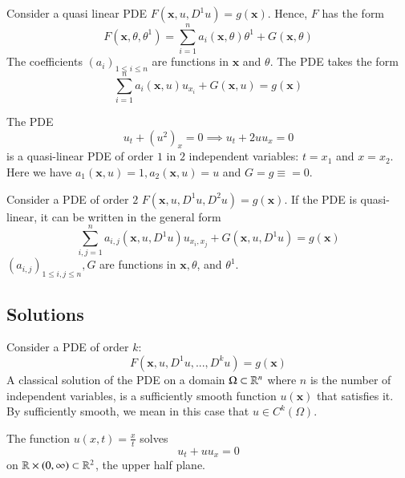 \documentclass[12pt, a4paper, oneside, openright, titlepage]{book}
\begin{document}
Consider a quasi linear PDE $F(\mathbf{x},u,D^1u) = g(\mathbf{x})$. Hence, $F$ has the form \begin{equation*}
    F(\mathbf{x},\theta,\theta^1) = \sum_{i=1}^na_i(\mathbf{x},\theta)\theta^1 + G(\mathbf{x},\theta)
\end{equation*}
The coefficients $(a_i)_{1\leq i \leq n}$ are functions in $\mathbf{x}$ and $\theta$. The PDE takes the form \begin{equation*}
    \sum_{i=1}^na_i(\mathbf{x},u)u_{x_i}+G(\mathbf{x},u) = g(\mathbf{x})
\end{equation*}
\begin{eg}
    The PDE \begin{equation*}
        u_t+(u^2)_x = 0 \implies u_t+2uu_x = 0
    \end{equation*}
    is a quasi-linear PDE of order $1$ in $2$ independent variables: $t = x_1$ and $x = x_2$. Here we have $a_1(\mathbf{x},u) = 1, a_2(\mathbf{x},u) = u$ and $G=g \equiv = 0$.
\end{eg}

Consider a PDE of order $2$ $F(\mathbf{x},u,D^1u,D^2u)=g(\mathbf{x})$. If the PDE is quasi-linear, it can be written in the general form \begin{equation*}
    \sum_{i,j=1}^na_{i,j}(\mathbf{x},u,D^1u)u_{x_i,x_j}+G(\mathbf{x},u,D^1u)= g(\mathbf{x})
\end{equation*}
$(a_{i,j})_{1\leq i,j\leq n}, G$ are functions in $\mathbf{x},\theta$, and $\theta^1$.

\subsection{Solutions}

\begin{defn}
    Consider a PDE of order $k$: \begin{equation*}
        F(\mathbf{x},u,D^1u,...,D^ku) = g(\mathbf{x})
    \end{equation*}
    A classical solution of the PDE on a domain $\Omega \subset\mathbb R^n$ where $n$ is the number of independent variables, is a sufficiently smooth function $u(\mathbf{x})$ that satisfies it. By sufficiently smooth, we mean in this case that $u \in C^k(\Omega)$.
\end{defn}



\begin{eg}
    The function $u(x,t) = \frac{x}{t}$ solves \begin{equation*}
        u_t + uu_x = 0
    \end{equation*}
    on $\mathbb R\times (0,\infty)\subset \mathbb R^2$, the upper half plane.
\end{eg}
\end{document}
